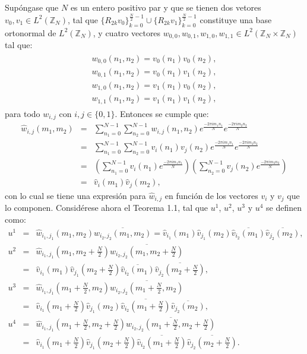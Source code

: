 \par Sup\'ongase que $N$ es un entero positivo par y que se tienen dos vetores $v_0,v_1\in L^2(\mathbb{Z}_N)$, tal que $\{R_{2k}v_0\}_{k=0}^{\frac{N}{2}-1}\cup\{R_{2k}v_1\}_{k=0}^{\frac{N}{2}-1}$ constituye una base ortonormal de $L^2(\mathbb{Z}_N)$, y cuatro vectores $w_{0,0},w_{0,1},w_{1,0},w_{1,1}\in L^2(\mathbb{Z}_N\times\mathbb{Z}_N)$ tal que:
\begin{eqnarray}
\begin{array}{c}
w_{0,0}(n_1,n_2)=v_0(n_1)v_0(n_2),\\
w_{0,1}(n_1,n_2)=v_0(n_1)v_1(n_2),\\
w_{1,0}(n_1,n_2)=v_1(n_1)v_0(n_2),\\
w_{1,1}(n_1,n_2)=v_1(n_1)v_1(n_2),
\label{definicion-filtro-2d}
\end{array}
\end{eqnarray}
para todo $w_{i,j}$ con $i,j\in\{0,1\}$. Entonces se cumple que:
\begin{eqnarray}
\hat{w}_{i,j}(m_1,m_2)&=&\sum_{n_1=0}^{N-1}\sum_{n_2=0}^{N-1}w_{i,j}(n_1,n_2)e^{\frac{-2\pi im_1n_1}{N}}e^{\frac{-2\pi im_2n_2}{N}}\nonumber\\
&=&\sum_{n_1=0}^{N-1}\sum_{n_2=0}^{N-1}v_i(n_1)v_j(n_2)e^{\frac{-2\pi im_1n_1}{N}}e^{\frac{-2\pi im_2n_2}{N}}\nonumber\\
&=&\left(\sum_{n_1=0}^{N-1}v_i(n_1)e^{\frac{-2\pi im_1n_1}{N}}\right)\left(\sum_{n_2=0}^{N-1}v_j(n_2)e^{\frac{-2\pi im_2n_2}{N}}\right)\nonumber\\
&=&\hat{v}_i(m_1)\hat{v}_j(m_2),\nonumber
\end{eqnarray}
con lo cual se tiene una expresi\'on para $\hat{w}_{i,j}$ en funci\'on de los vectores $v_i$ y $v_j$ que lo componen. Consid\'erese ahora el Teorema 1.1, tal que $u^1$, $u^2$, $u^3$ y $u^4$ se definen como:
\begin{eqnarray}
u^1&=&\hat{w}_{i_1,j_1}(m_1,m_2)\overline{\hat{w}_{i_2,j_2}(m_1,m_2)}=\hat{v}_{i_1}(m_1)\hat{v}_{j_1}(m_2)\overline{\hat{v}_{i_2}(m_1)}\overline{\hat{v}_{j_2}(m_2)},\nonumber\\
u^2&=&\hat{w}_{i_1,j_1}\left(m_1,m_2+\frac{N}{2}\right)\overline{\hat{w}_{i_2,j_2}\left(m_1,m_2+\frac{N}{2}\right)}\nonumber\\&=&\hat{v}_{i_1}(m_1)\hat{v}_{j_1}\left(m_2+\frac{N}{2}\right)\overline{\hat{v}_{i_2}(m_1)}\overline{\hat{v}_{j_2}\left(m_2+\frac{N}{2}\right)},\nonumber\\
u^3&=&\hat{w}_{i_1,j_1}\left(m_1+\frac{N}{2},m_2\right)\overline{\hat{w}_{i_2,j_2}\left(m_1+\frac{N}{2},m_2\right)}\nonumber\\&=&\hat{v}_{i_1}\left(m_1+\frac{N}{2}\right)\hat{v}_{j_1}\left(m_2\right)\overline{\hat{v}_{i_2}\left(m_1+\frac{N}{2}\right)}\overline{\hat{v}_{j_2}\left(m_2\right)},\nonumber\\
u^4&=&\hat{w}_{i_1,j_1}\left(m_1+\frac{N}{2},m_2+\frac{N}{2}\right)\overline{\hat{w}_{i_2,j_2}\left(m_1+\frac{N}{2},m_2+\frac{N}{2}\right)}\nonumber\\&=&\hat{v}_{i_1}\left(m_1+\frac{N}{2}\right)\hat{v}_{j_1}\left(m_2+\frac{N}{2}\right)\overline{\hat{v}_{i_2}\left(m_1+\frac{N}{2}\right)}\overline{\hat{v}_{j_2}\left(m_2+\frac{N}{2}\right)}.\nonumber
\end{eqnarray}
